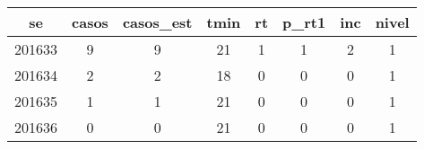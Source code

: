 \begin{tabular}{c|ccccccc}
  \hline
se & casos & casos\_est & tmin & rt & p\_rt1 & inc & nivel \\ 
  \hline
201633 & 9 & 9 & 21 & 1 & 1 & 2 & 1 \\ 
  201634 & 2 & 2 & 18 & 0 & 0 & 0 & 1 \\ 
  201635 & 1 & 1 & 21 & 0 & 0 & 0 & 1 \\ 
  201636 & 0 & 0 & 21 & 0 & 0 & 0 & 1 \\ 
   \hline
\end{tabular}
